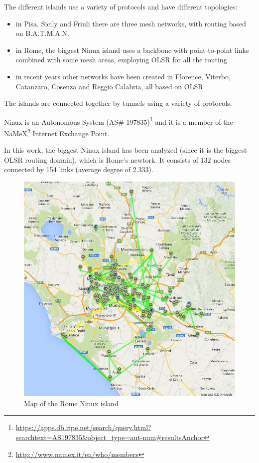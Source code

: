 \documentclass[oneside,openany]{memoir}
\begin{document}
The different islands use a variety of protocols and have different
topologies:

\begin{itemize}
\itemsep1pt\parskip0pt
\item
  in Pisa, Sicily and Friuli there are three mesh networks, with routing
  based on B.A.T.M.A.N.
\item
  in Rome, the biggest Ninux island uses a backbone with point-to-point
  links combined with some mesh areas, employing OLSR for all the
  routing
\item
  in recent years other networks have been created in Florence, Viterbo,
  Catanzaro, Cosenza and Reggio Calabria, all based on OLSR
\end{itemize}

The islands are connected together by tunnels using a variety of
protocols.

Ninux is an Autonomous System (AS\# 197835)\footnote{\url{https://apps.db.ripe.net/search/query.html?searchtext=AS197835\&object_type=aut-num\#resultsAnchor}}
and it is a member of the NaMeX\footnote{\url{http://www.namex.it/en/who/members}}
Internet Exchange Point.

In this work, the biggest Ninux island has been analyzed (since it is
the biggest OLSR routing domain), which is Rome's newtork. It consists
of 132 nodes connected by 154 links (average degree of 2.333).

\begin{figure}[htbp]
\centering
\includegraphics{images/ninux_map.png}
\caption{Map of the Rome Ninux island}
\end{figure}
\end{document}
